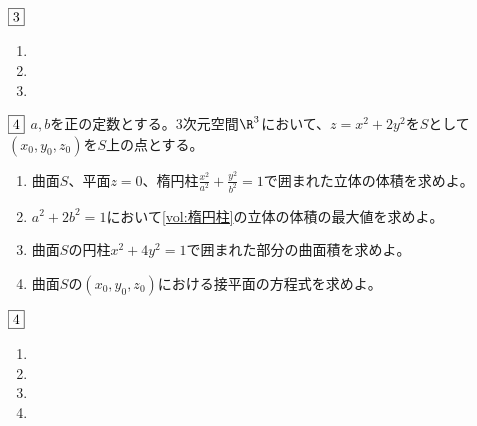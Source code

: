 \documentclass[dvipdfmx]{jsreport}
\begin{document}
\begin{souanswer} %
	$\fbox{3}$
\begin{enumerate}
	\item 
	\item 
	\item 
\end{enumerate}
\end{souanswer}


\begin{tcolorbox} %
	$\fbox{4}$ $a, b$を正の定数とする。3次元空間$\R^3$において、$z= x^2+ 2y^2$を$S$として$(x_0, y_0, z_0)$を$S$上の点とする。
\begin{enumerate}
	\item\label{vol:楕円柱} 曲面$S$、平面$z= 0$、楕円柱$\frac{x^2}{a^2}+ \frac{y^2}{b^2}= 1$で囲まれた立体の体積を求めよ。
	\item $a^2 +2b^2= 1$において\ref{vol:楕円柱}の立体の体積の最大値を求めよ。
	\item 曲面$S$の円柱$x^2+ 4y^2= 1$で囲まれた部分の曲面積を求めよ。
	\item 曲面$S$の$(x_0, y_0, z_0)$における接平面の方程式を求めよ。
\end{enumerate}
\end{tcolorbox}

\begin{souanswer} %
	$\fbox{4}$
\begin{enumerate}
	\item 
	\item 
	\item 
	\item 
\end{enumerate}
\end{souanswer}
\end{document}
